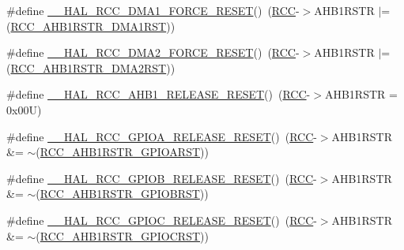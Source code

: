 \begin{DoxyCompactItemize}
\item 
\#define \hyperlink{group___r_c_c___a_h_b1___force___release___reset_ga9135dece327ecc27f333f86dcf3ba8ee}{\+\_\+\+\_\+\+H\+A\+L\+\_\+\+R\+C\+C\+\_\+\+D\+M\+A1\+\_\+\+F\+O\+R\+C\+E\+\_\+\+R\+E\+S\+ET}()~(\hyperlink{group___peripheral__declaration_ga74944438a086975793d26ae48d5882d4}{R\+CC}-\/$>$A\+H\+B1\+R\+S\+TR $\vert$= (\hyperlink{group___peripheral___registers___bits___definition_ga4d1655ddfb777fce28b1d6b9a9c2d0e0}{R\+C\+C\+\_\+\+A\+H\+B1\+R\+S\+T\+R\+\_\+\+D\+M\+A1\+R\+ST}))
\item 
\#define \hyperlink{group___r_c_c___a_h_b1___force___release___reset_gaf0be736e6cdebf31eeded223acc25613}{\+\_\+\+\_\+\+H\+A\+L\+\_\+\+R\+C\+C\+\_\+\+D\+M\+A2\+\_\+\+F\+O\+R\+C\+E\+\_\+\+R\+E\+S\+ET}()~(\hyperlink{group___peripheral__declaration_ga74944438a086975793d26ae48d5882d4}{R\+CC}-\/$>$A\+H\+B1\+R\+S\+TR $\vert$= (\hyperlink{group___peripheral___registers___bits___definition_ga827aea44c35a0c3eb815a5d7d8546c7b}{R\+C\+C\+\_\+\+A\+H\+B1\+R\+S\+T\+R\+\_\+\+D\+M\+A2\+R\+ST}))
\item 
\#define \hyperlink{group___r_c_c___a_h_b1___force___release___reset_ga23b6a1e77c4f045c29cc36a4b1e910b0}{\+\_\+\+\_\+\+H\+A\+L\+\_\+\+R\+C\+C\+\_\+\+A\+H\+B1\+\_\+\+R\+E\+L\+E\+A\+S\+E\+\_\+\+R\+E\+S\+ET}()~(\hyperlink{group___peripheral__declaration_ga74944438a086975793d26ae48d5882d4}{R\+CC}-\/$>$A\+H\+B1\+R\+S\+TR = 0x00\+U)
\item 
\#define \hyperlink{group___r_c_c___a_h_b1___force___release___reset_gad56e47c2eacd972491f94296053d0cc3}{\+\_\+\+\_\+\+H\+A\+L\+\_\+\+R\+C\+C\+\_\+\+G\+P\+I\+O\+A\+\_\+\+R\+E\+L\+E\+A\+S\+E\+\_\+\+R\+E\+S\+ET}()~(\hyperlink{group___peripheral__declaration_ga74944438a086975793d26ae48d5882d4}{R\+CC}-\/$>$A\+H\+B1\+R\+S\+TR \&= $\sim$(\hyperlink{group___peripheral___registers___bits___definition_ga6c171937e46c2b9a58f16ee82010509e}{R\+C\+C\+\_\+\+A\+H\+B1\+R\+S\+T\+R\+\_\+\+G\+P\+I\+O\+A\+R\+ST}))
\item 
\#define \hyperlink{group___r_c_c___a_h_b1___force___release___reset_gaf03da3b36478071844fbd77df618a686}{\+\_\+\+\_\+\+H\+A\+L\+\_\+\+R\+C\+C\+\_\+\+G\+P\+I\+O\+B\+\_\+\+R\+E\+L\+E\+A\+S\+E\+\_\+\+R\+E\+S\+ET}()~(\hyperlink{group___peripheral__declaration_ga74944438a086975793d26ae48d5882d4}{R\+CC}-\/$>$A\+H\+B1\+R\+S\+TR \&= $\sim$(\hyperlink{group___peripheral___registers___bits___definition_ga8e60d32cb67768339fc47a2ba11b7a97}{R\+C\+C\+\_\+\+A\+H\+B1\+R\+S\+T\+R\+\_\+\+G\+P\+I\+O\+B\+R\+ST}))
\item 
\#define \hyperlink{group___r_c_c___a_h_b1___force___release___reset_ga1df0e3536d3450435bdccdbe9c878736}{\+\_\+\+\_\+\+H\+A\+L\+\_\+\+R\+C\+C\+\_\+\+G\+P\+I\+O\+C\+\_\+\+R\+E\+L\+E\+A\+S\+E\+\_\+\+R\+E\+S\+ET}()~(\hyperlink{group___peripheral__declaration_ga74944438a086975793d26ae48d5882d4}{R\+CC}-\/$>$A\+H\+B1\+R\+S\+TR \&= $\sim$(\hyperlink{group___peripheral___registers___bits___definition_ga8d02a09e1dafda744c7b27dca99fa3ef}{R\+C\+C\+\_\+\+A\+H\+B1\+R\+S\+T\+R\+\_\+\+G\+P\+I\+O\+C\+R\+ST}))

\end{DoxyCompactItemize}
